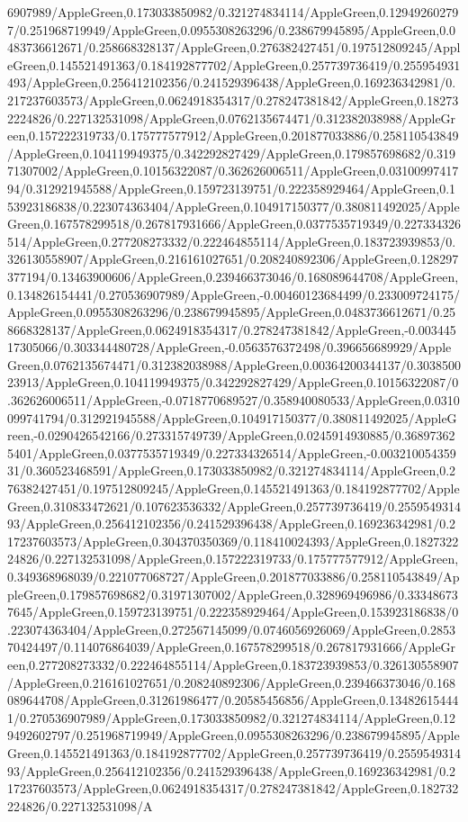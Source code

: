 {\begin{tikzternal}
{6907989/AppleGreen,0.173033850982/0.321274834114/AppleGreen,0.129492602797/0.251968719949/AppleGreen,0.0955308263296/0.238679945895/AppleGreen,0.0483736612671/0.258668328137/AppleGreen,0.276382427451/0.197512809245/AppleGreen,0.145521491363/0.184192877702/AppleGreen,0.257739736419/0.255954931493/AppleGreen,0.256412102356/0.241529396438/AppleGreen,0.169236342981/0.217237603573/AppleGreen,0.0624918354317/0.278247381842/AppleGreen,0.182732224826/0.227132531098/AppleGreen,0.0762135674471/0.312382038988/AppleGreen,0.157222319733/0.175777577912/AppleGreen,0.201877033886/0.258110543849/AppleGreen,0.104119949375/0.342292827429/AppleGreen,0.179857698682/0.31971307002/AppleGreen,0.10156322087/0.362626006511/AppleGreen,0.0310099741794/0.312921945588/AppleGreen,0.159723139751/0.222358929464/AppleGreen,0.153923186838/0.223074363404/AppleGreen,0.104917150377/0.380811492025/AppleGreen,0.167578299518/0.267817931666/AppleGreen,0.0377535719349/0.227334326514/AppleGreen,0.277208273332/0.222464855114/AppleGreen,0.183723939853/0.326130558907/AppleGreen,0.216161027651/0.208240892306/AppleGreen,0.128297377194/0.13463900606/AppleGreen,0.239466373046/0.168089644708/AppleGreen,0.134826154441/0.270536907989/AppleGreen,-0.00460123684499/0.233009724175/AppleGreen,0.0955308263296/0.238679945895/AppleGreen,0.0483736612671/0.258668328137/AppleGreen,0.0624918354317/0.278247381842/AppleGreen,-0.00344517305066/0.303344480728/AppleGreen,-0.0563576372498/0.396656689929/AppleGreen,0.0762135674471/0.312382038988/AppleGreen,0.00364200344137/0.303850023913/AppleGreen,0.104119949375/0.342292827429/AppleGreen,0.10156322087/0.362626006511/AppleGreen,-0.0718770689527/0.358940080533/AppleGreen,0.0310099741794/0.312921945588/AppleGreen,0.104917150377/0.380811492025/AppleGreen,-0.0290426542166/0.273315749739/AppleGreen,0.0245914930885/0.368973625401/AppleGreen,0.0377535719349/0.227334326514/AppleGreen,-0.00321005435931/0.360523468591/AppleGreen,0.173033850982/0.321274834114/AppleGreen,0.276382427451/0.197512809245/AppleGreen,0.145521491363/0.184192877702/AppleGreen,0.310833472621/0.107623536332/AppleGreen,0.257739736419/0.255954931493/AppleGreen,0.256412102356/0.241529396438/AppleGreen,0.169236342981/0.217237603573/AppleGreen,0.304370350369/0.118410024393/AppleGreen,0.182732224826/0.227132531098/AppleGreen,0.157222319733/0.175777577912/AppleGreen,0.349368968039/0.221077068727/AppleGreen,0.201877033886/0.258110543849/AppleGreen,0.179857698682/0.31971307002/AppleGreen,0.328969496986/0.333486737645/AppleGreen,0.159723139751/0.222358929464/AppleGreen,0.153923186838/0.223074363404/AppleGreen,0.272567145099/0.0746056926069/AppleGreen,0.285370424497/0.114076864039/AppleGreen,0.167578299518/0.267817931666/AppleGreen,0.277208273332/0.222464855114/AppleGreen,0.183723939853/0.326130558907/AppleGreen,0.216161027651/0.208240892306/AppleGreen,0.239466373046/0.168089644708/AppleGreen,0.31261986477/0.20585456856/AppleGreen,0.134826154441/0.270536907989/AppleGreen,0.173033850982/0.321274834114/AppleGreen,0.129492602797/0.251968719949/AppleGreen,0.0955308263296/0.238679945895/AppleGreen,0.145521491363/0.184192877702/AppleGreen,0.257739736419/0.255954931493/AppleGreen,0.256412102356/0.241529396438/AppleGreen,0.169236342981/0.217237603573/AppleGreen,0.0624918354317/0.278247381842/AppleGreen,0.182732224826/0.227132531098/A}
\end{tikzternal}}
